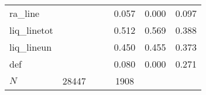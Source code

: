 \begin{table}[htbp]
\begin{tabular}{l*{2}{ccc}}
ra\_line     &            &            &            &       0.057&       0.000&       0.097\\
liq\_linetot &            &            &            &       0.512&       0.569&       0.388\\
liq\_lineun  &            &            &            &       0.450&       0.455&       0.373\\
def         &            &            &            &       0.080&       0.000&       0.271\\
\hline
\(N\)       &       28447&            &            &        1908&            &            \\
\hline\hline
\end{tabular}
\end{table}
